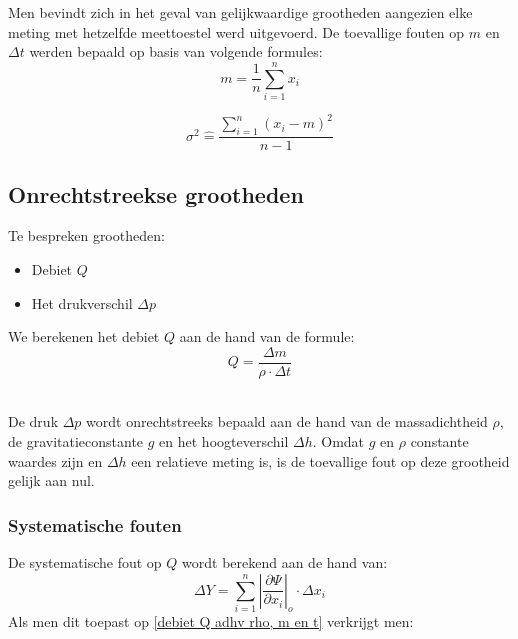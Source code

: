 Men bevindt zich in het geval van gelijkwaardige grootheden aangezien elke meting
met hetzelfde meettoestel werd uitgevoerd. De toevallige fouten op $m$ en $\Delta t$
werden bepaald op basis van volgende formules:
\begin{equation}
    m = \frac{1}{n} \sum\limits_{i=1}^n x_i
\end{equation}

\begin{equation}
    \sigma^{2} \hat{=} \frac{\sum\limits_{i=1}^n (x_i - m)^2}{n - 1}
\end{equation}



\subsection{Onrechtstreekse grootheden}

Te bespreken grootheden:
\begin{itemize}
    \item Debiet $Q$
    \item Het drukverschil $\Delta p$
\end{itemize}

We berekenen het debiet $Q$ aan de hand van de formule: 
\begin{equation}
\label{debiet Q adhv rho, m en t}
    Q = \frac{\Delta m}{\rho \cdot \Delta t}
\end{equation}

\\

De druk $\Delta p$ wordt onrechtstreeks bepaald aan de hand
van de massadichtheid $\rho$, de gravitatieconstante $g$ en
het hoogteverschil $\Delta h$. Omdat $g$ en $\rho$ constante
waardes zijn en $\Delta h$ een relatieve meting is, is de
toevallige fout op deze grootheid gelijk aan nul.


\subsubsection{Systematische fouten}
De systematische fout op $Q$ wordt berekend aan de hand van:
\begin{equation}
    \Delta Y = \sum\limits_{i=1}^n \left|\frac{\partial \Psi}{\partial x_i}\right|_o \cdot \Delta x_i 
\end{equation}
Als men dit toepast op \eqref{debiet Q adhv rho, m en t} verkrijgt men:

